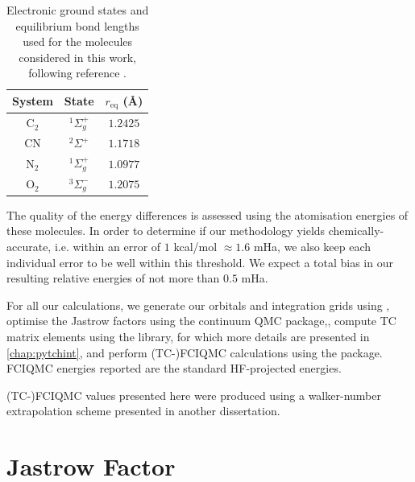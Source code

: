 \begin{table}[htbp]
    \centering
      \caption{
      Electronic ground states and equilibrium bond lengths used for the
      molecules considered in this work, following reference .
    }
    \label{table:bond_lengths}
    \begin{tabular}{ccc}
      System & State & $r_\mathrm{eq}$ (\AA) \\
    \hline \hline
      C$_2$ & ${}^1\Sigma_g^+$ & $1.2425$ \\
      CN    & ${}^2\Sigma^+$   & $1.1718$ \\
      N$_2$ & ${}^1\Sigma_g^+$ & $1.0977$ \\
      O$_2$ & ${}^3\Sigma_g^-$ & $1.2075$ \\
    \hline
    \end{tabular}
\end{table}

The quality of the energy differences is assessed using the atomisation energies of these molecules. In order to determine if our methodology yields chemically-accurate, i.e. within an error of $1$ kcal/mol $\approx 1.6$ mHa, we also keep each individual error to be well within this threshold. We expect a total bias in our resulting relative energies of not more than $0.5$ mHa.

For all our calculations, we generate our orbitals and integration grids using \pyscf,\supercite{sunPySCF2018} optimise the Jastrow factors using the \casino continuum \gls{QMC} package,\supercite{needsVariational2020}, compute TC matrix elements using the \tchint library, for which more details are presented in \autoref{chap:pytchint}, and perform (TC-)FCIQMC calculations using the \neci package.\supercite{gutherNECI2020} FCIQMC energies reported are the standard HF-projected energies.

(TC-)FCIQMC values presented here were produced using a walker-number extrapolation scheme presented in another dissertation.\supercite{hosseiniCombining2024}

\section{Jastrow Factor}


